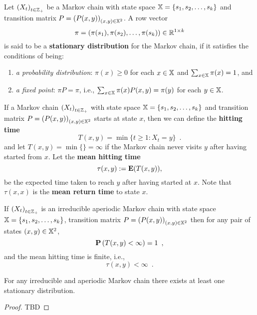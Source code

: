 {\begin{definition}
Let $\left( X_t \right)_{t \in \mathbb{Z}_+}$ be a Markov chain with state space $\mathbb{X}=\{s_1,s_2,\ldots,s_k\}$ and transition matrix $P = \left( P(x,y) \right)_{(x,y) \in \mathbb{X}^2}$.  A row vector $$\pi = \left( \pi(s_1), \pi(s_2), \ldots, \pi(s_k) \right) \in \mathbb{R}^{1\times k}$$ is said to be a {\bf stationary distribution} for the Markov chain, if it satisfies the conditions of being:
\begin{enumerate}
\item {\em a probability distribution}: $\pi(x) \geq 0$ for each $x \in \mathbb{X}$ and $\sum_{x \in \mathbb{X}} \pi(x) = 1$, and
\item {\em a fixed point}: $\pi P = \pi$, i.e., $\sum_{x \in \mathbb{X}} \pi(x) P(x,y) = \pi(y)$ for each $y \in \mathbb{X}$.
\end{enumerate}
\end{definition}

\begin{definition}
If a Markov chain $\left( X_t \right)_{t \in \mathbb{Z}_+}$ with state space $\mathbb{X}=\{s_1,s_2,\ldots,s_k\}$ and transition matrix $P = \left( P(x,y) \right)_{(x,y) \in \mathbb{X}^2}$ starts at state $x$, then we can define the {\bf hitting time}
\[
T(x,y) = \min \{ t \geq 1: X_t = y \} \enspace .
\]
and let $T(x,y) = \min \{\} = \infty$ if the Markov chain never visits $y$ after having started from $x$.  Let the {\bf  mean hitting time} 
\[
\tau(x,y) := \mathbf{E}(T(x,y)) ,
\]
be the expected time taken to reach $y$ after having started at $x$.  Note that $\tau(x,x)$ is the {\bf mean return time} to state $x$.
\end{definition}

\begin{prop}  
If  $\left( X_t \right)_{t \in \mathbb{Z}_+}$ is an irreducible aperiodic Markov chain with state space $\mathbb{X}=\{s_1,s_2,\ldots,s_k\}$, transition matrix $P = \left( P(x,y) \right)_{(x,y) \in \mathbb{X}^2}$ then for any pair of states ${(x,y) \in \mathbb{X}^2}$,
\[
\mathbf{P}\left( T(x,y) < \infty \right) = 1 \enspace ,
\]
and the mean hitting time is finite, i.e.,
\[
\tau(x,y) < \infty \enspace .
\]
\end{prop}

\begin{prop}
For any irreducible and aperiodic Markov chain there exists at least one stationary distribution.
\begin{proof}
TBD
\end{proof}
\end{prop}

}
